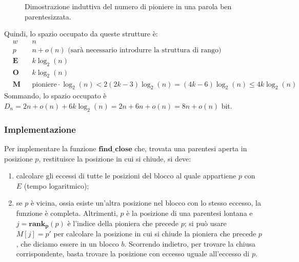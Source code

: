 \begin{figure}[h]
\begin{subfigure}{0.45\textwidth}
	\end{subfigure}
	\caption{Dimostrazione induttiva del numero di pioniere in una parola ben parentesizzata.}
	\label{fig:proof_pioneers}
\end{figure}

Quindi, lo spazio occupato da queste strutture è:
$$
	\begin{aligned}
		 & w          &  & n                                                                                          \\
		 & p          &  & n + o(n) \text{ (sarà necessario introdurre la struttura di rango)}                        \\
		 & \mathbf{E} &  & k  \log_2(n)                                                                               \\
		 & \mathbf{O} &  & k  \log_2(n)                                                                               \\
		 & \mathbf{M} &  & \text{pioniere} \cdot \log_2(n) < 2(2k - 3) \log_2(n) = (4k - 6) \log_2(n) \le 4k\log_2(n)
	\end{aligned}
$$
Sommando, lo spazio occupato è $D_n = 2n + o(n) + 6k \log_2(n) = 2n + 6n + o(n) = 8n + o(n)$ bit.

\subsubsection{Implementazione}
Per implementare la funzione $\mathbf{find\_close}$ che, trovata una parentesi aperta in posizione $p$, restituisce
la posizione in cui si chiude, si deve:
\begin{enumerate}
	\item calcolare gli eccessi di tutte le posizioni del blocco al quale appartiene $p$ con $E$ (tempo logaritmico);
	\item se $p$ è vicina, ossia esiste un'altra posizione nel blocco con lo stesso eccesso,
	      la funzione è completa. Altrimenti, $p$ è la posizione di una parentesi lontana e
	      $j = \mathbf{rank_p}(p)$ è l'indice della pioniera che precede $p$; si può usare $M[j] = p'$ per
	      calcolare la posizione in cui si chiude la pioniera che precede $p$, che diciamo essere in un
	      blocco $b$. Scorrendo indietro, per trovare la chiusa corrispondente, basta trovare la
	      posizione con eccesso uguale all'eccesso di $p$.
\end{enumerate}

